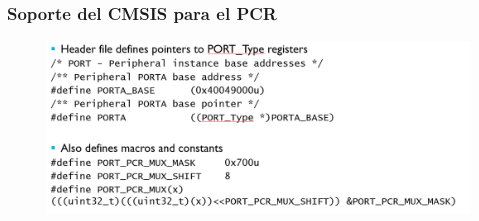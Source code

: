 \documentclass[10.5pt,scale=1.0,t,aspectratio=169,hyperref={pdfpagelabels=false}]{beamer}
\begin{document}
\begin{frame}
	\frametitle{Soporte del CMSIS para el PCR}
	\begin{figure}
		\centering
		\includegraphics[scale=0.4]{16_MaskPCR}
	\end{figure}
\end{frame}
\end{document}
